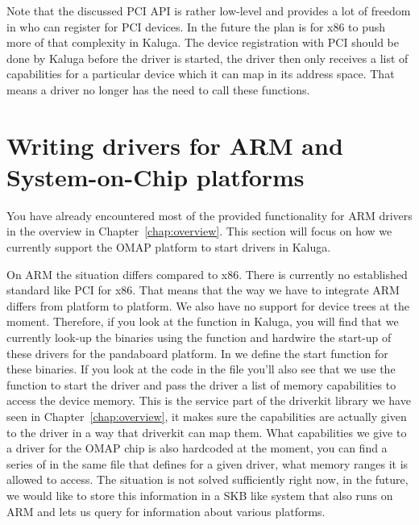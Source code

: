 \documentclass[a4paper,11pt,twoside]{report}
\begin{document}
Note that the discussed PCI API is rather low-level and provides a lot of
freedom in who can register for PCI devices. In the future the plan is for x86
to push more of that complexity in Kaluga. The device registration with PCI
should be done by Kaluga before the driver is started, the driver then only
receives a list of capabilities for a particular device which it can map in
its address space. That means a driver no longer has the need to call these
functions.

\section{Writing drivers for ARM and System-on-Chip platforms}
\label{sec:armdriverwriting}

You have already encountered most of the provided functionality for ARM
drivers in the overview in Chapter~\ref{chap:overview}. This section
will focus on how we currently support the OMAP platform to start
drivers in Kaluga.

On ARM the situation differs compared to x86. There is currently no
established standard like PCI for x86. That means that the way we have to
integrate ARM differs from platform to platform. We also have no support for
device trees at the moment. Therefore, if you look at the 
function in Kaluga, you will find that we currently look-up the binaries using
the  function and hardwire the start-up of these drivers
for the pandaboard platform. In  we define the start
function for these binaries. If you look at the code in the file you'll also
see that we use the function  to start the
driver and pass the driver a list of memory capabilities to access the device
memory. This is the service part of the driverkit library we have seen in
Chapter~\ref{chap:overview}, it makes sure the capabilities are actually given
to the driver in a way that driverkit can map them. What capabilities we give
to a driver for the OMAP chip is also hardcoded at the moment, you can find a
series of  in the same file that defines for a
given driver, what memory ranges it is allowed to access. The situation is not
solved sufficiently right now, in the future, we would like to store this
information in a SKB like system that also runs on ARM and lets us query for
information about various platforms.
\end{document}
